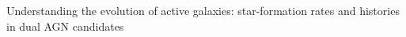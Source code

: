 Understanding the evolution of active galaxies: star-formation rates and histories in dual AGN candidates
  
  